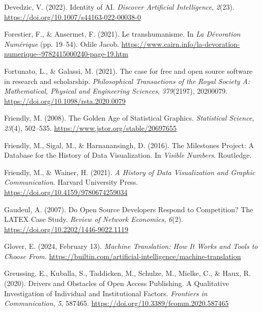 \documentclass[
  letterpaper,
  DIV=11,
  numbers=noendperiod]{scrreprt}
\newlength{\cslhangindent}
\newlength{\cslentryspacingunit} %
\newenvironment{CSLReferences}[2] %
 {%
  \setlength{\parindent}{0pt}
  \ifodd #1
  \let\oldpar\par
  \def\par{\hangindent=\cslhangindent\oldpar}
  \fi
  \setlength{\parskip}{#2\cslentryspacingunit}
 }%
 {}
\begin{document}
\begin{CSLReferences}{1}{0}
\leavevmode{}%
Devedzic, V. (2022). Identity of {AI}. \emph{Discover Artificial
Intelligence}, \emph{2}(23).
\url{https://doi.org/10.1007/s44163-022-00038-0}

\leavevmode{}%
Forestier, F., \& Ansermet, F. (2021). Le transhumanisme. In \emph{La
{Dévoration Numérique}} (pp. 19--54). Odile Jacob.
\url{https://www.cairn.info/la-devoration-numerique--9782415000240-page-19.htm}

\leavevmode{}%
Fortunato, L., \& Galassi, M. (2021). The case for free and open source
software in research and scholarship. \emph{Philosophical Transactions
of the Royal Society A: Mathematical, Physical and Engineering
Sciences}, \emph{379}(2197), 20200079.
\url{https://doi.org/10.1098/rsta.2020.0079}

\leavevmode{}%
Friendly, M. (2008). The {Golden Age} of {Statistical Graphics}.
\emph{Statistical Science}, \emph{23}(4), 502--535.
\url{https://www.jstor.org/stable/20697655}

\leavevmode{}%
Friendly, M., Sigal, M., \& Harnanansingh, D. (2016). The {Milestones
Project}: {A Database} for the {History} of {Data Visualization}. In
\emph{Visible {Numbers}}. Routledge.

\leavevmode{}%
Friendly, M., \& Wainer, H. (2021). \emph{A {History} of {Data
Visualization} and {Graphic Communication}}. Harvard University Press.
\url{https://doi.org/10.4159/9780674259034}

\leavevmode{}%
Gaudeul, A. (2007). Do {Open Source Developers Respond} to
{Competition}? {The LATEX Case Study}. \emph{Review of Network
Economics}, \emph{6}(2). \url{https://doi.org/10.2202/1446-9022.1119}

\leavevmode{}%
Glover, E. (2024, February 13). \emph{Machine {Translation}: {How It
Works} and {Tools} to {Choose From}}.
\url{https://builtin.com/artificial-intelligence/machine-translation}

\leavevmode{}%
Greussing, E., Kuballa, S., Taddicken, M., Schulze, M., Mielke, C., \&
Haux, R. (2020). Drivers and {Obstacles} of {Open Access Publishing}. {A
Qualitative Investigation} of {Individual} and {Institutional Factors}.
\emph{Frontiers in Communication}, \emph{5}, 587465.
\url{https://doi.org/10.3389/fcomm.2020.587465}


\end{CSLReferences}
\end{document}
